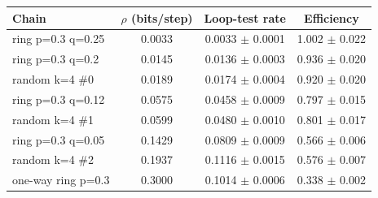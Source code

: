 \begin{tabular}{lccc}
\toprule
Chain & $\rho$ (bits/step) & Loop-test rate & Efficiency \\
\midrule
ring p=0.3 q=0.25 & 0.0033 & 0.0033 $\pm$ 0.0001 & 1.002 $\pm$ 0.022 \\
ring p=0.3 q=0.2 & 0.0145 & 0.0136 $\pm$ 0.0003 & 0.936 $\pm$ 0.020 \\
random k=4 \#0 & 0.0189 & 0.0174 $\pm$ 0.0004 & 0.920 $\pm$ 0.020 \\
ring p=0.3 q=0.12 & 0.0575 & 0.0458 $\pm$ 0.0009 & 0.797 $\pm$ 0.015 \\
random k=4 \#1 & 0.0599 & 0.0480 $\pm$ 0.0010 & 0.801 $\pm$ 0.017 \\
ring p=0.3 q=0.05 & 0.1429 & 0.0809 $\pm$ 0.0009 & 0.566 $\pm$ 0.006 \\
random k=4 \#2 & 0.1937 & 0.1116 $\pm$ 0.0015 & 0.576 $\pm$ 0.007 \\
one-way ring p=0.3 & 0.3000 & 0.1014 $\pm$ 0.0006 & 0.338 $\pm$ 0.002 \\
\bottomrule
\end{tabular}
